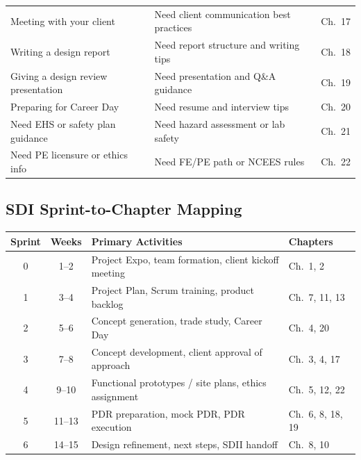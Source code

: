 \begin{center}
\begin{tabularx}{\textwidth}{l X l}
Meeting with your client & Need client communication best practices & Ch.~17 \\
Writing a design report & Need report structure and writing tips & Ch.~18 \\
Giving a design review presentation & Need presentation and Q\&A guidance & Ch.~19 \\
Preparing for Career Day & Need resume and interview tips & Ch.~20 \\
Need EHS or safety plan guidance & Need hazard assessment or lab safety & Ch.~21 \\
Need PE licensure or ethics info & Need FE/PE path or NCEES rules & Ch.~22 \\
\bottomrule
\end{tabularx}
\end{center}

\subsection*{SDI Sprint-to-Chapter Mapping}
\begin{center}\small
\begin{tabularx}{\textwidth}{c c X l}
\toprule
\textbf{Sprint} & \textbf{Weeks} & \textbf{Primary Activities} & \textbf{Chapters} \\
\midrule
0 & 1--2 & Project Expo, team formation, client kickoff meeting & Ch.~1, 2 \\
1 & 3--4 & Project Plan, Scrum training, product backlog & Ch.~7, 11, 13 \\
2 & 5--6 & Concept generation, trade study, Career Day & Ch.~4, 20 \\
3 & 7--8 & Concept development, client approval of approach & Ch.~3, 4, 17 \\
4 & 9--10 & Functional prototypes / site plans, ethics assignment & Ch.~5, 12, 22 \\
5 & 11--13 & PDR preparation, mock PDR, PDR execution & Ch.~6, 8, 18, 19 \\
6 & 14--15 & Design refinement, next steps, SDII handoff & Ch.~8, 10 \\
\bottomrule
\end{tabularx}
\end{center}

